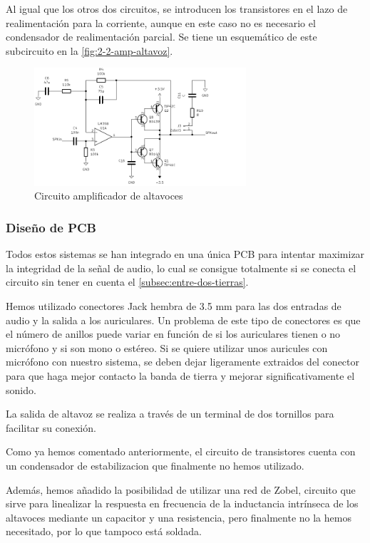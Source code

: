 Al igual que los otros dos circuitos, se introducen los transistores en el lazo de realimentación para la corriente, aunque en este caso no es necesario el condensador de realimentación parcial. Se tiene un esquemático de este subcircuito en la \autoref{fig:2-2-amp-altavoz}.

\begin{figure}[h]
    \centering
    \includegraphics[width=0.7\textwidth]{images/2/2-2/circuitoAmplificadorAltavoces.png}
    \caption{Circuito amplificador de altavoces}
    \label{fig:2-2-amp-altavoz}
\end{figure}

\subsubsection{Diseño de PCB}

Todos estos sistemas se han integrado en una única PCB para intentar maximizar la integridad de la señal de audio, lo cual se consigue totalmente si se conecta el circuito sin tener en cuenta el \autoref{subsec:entre-dos-tierras}.

Hemos utilizado conectores Jack hembra de 3.5 mm para las dos entradas de audio y la salida a los auriculares. Un problema de este tipo de conectores es que el número de anillos puede variar en función de si los auriculares tienen o no micrófono y si son mono o estéreo. Si se quiere utilizar unos auricules con micrófono con nuestro sistema, se deben dejar ligeramente extraidos del conector para que haga mejor contacto la banda de tierra y mejorar significativamente el sonido.

La salida de altavoz se realiza a través de un terminal de dos tornillos para facilitar su conexión.

Como ya hemos comentado anteriormente, el circuito de transistores cuenta con un condensador de estabilizacion que finalmente no hemos utilizado. 

Además, hemos añadido la posibilidad de utilizar una red de Zobel, circuito que sirve para linealizar la respuesta en frecuencia de la inductancia intrínseca de los altavoces mediante un capacitor y una resistencia, pero finalmente no la hemos necesitado, por lo que tampoco está soldada.

